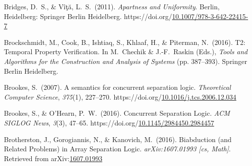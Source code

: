 \documentclass[12pt,twoside]{article}
\begin{document}
{\begin{thebibliography}{1079}
\mdbibitemlabel{}Bridges, D.~S., \& Vîţă, L.~S.~(2011). \emph{Apartness and Uniformity}. Berlin, Heidelberg: Springer Berlin Heidelberg. https://doi.org/\href{https://dx.doi.org/10.1007/978-3-642-22415-7}{10.1007/978-3-642-22415-7}%

\mdbibitemlabel{}Brockschmidt, M., Cook, B., Ishtiaq, S., Khlaaf, H., \& Piterman, N.~(2016). T2: Temporal Property Verification. In M.~Chechik \& J.-F.~Raskin (Eds.), \emph{Tools and Algorithms for the Construction and Analysis of Systems} (pp. 387–393). Springer Berlin Heidelberg.%

\mdbibitemlabel{}Brookes, S.~(2007). A semantics for concurrent separation logic. \emph{Theoretical Computer Science}, \emph{375}(1), 227–270. https://doi.org/\href{https://dx.doi.org/10.1016/j.tcs.2006.12.034}{10.1016/j.tcs.2006.12.034}%

\mdbibitemlabel{}Brookes, S., \& O’Hearn, P.~W.~(2016). Concurrent Separation Logic. \emph{ACM SIGLOG News}, \emph{3}(3), 47–65. https://doi.org/\href{https://dx.doi.org/10.1145/2984450.2984457}{10.1145/2984450.2984457}%

\mdbibitemlabel{}Brotherston, J., Gorogiannis, N., \& Kanovich, M.~(2016). Biabduction (and Related Problems) in Array Separation Logic. \emph{arXiv:1607.01993 {}[cs, Math]}. Retrieved from arXiv:\href{http://arxiv.org/abs/1607.01993}{1607.01993}%


\end{thebibliography}}
\end{document}
